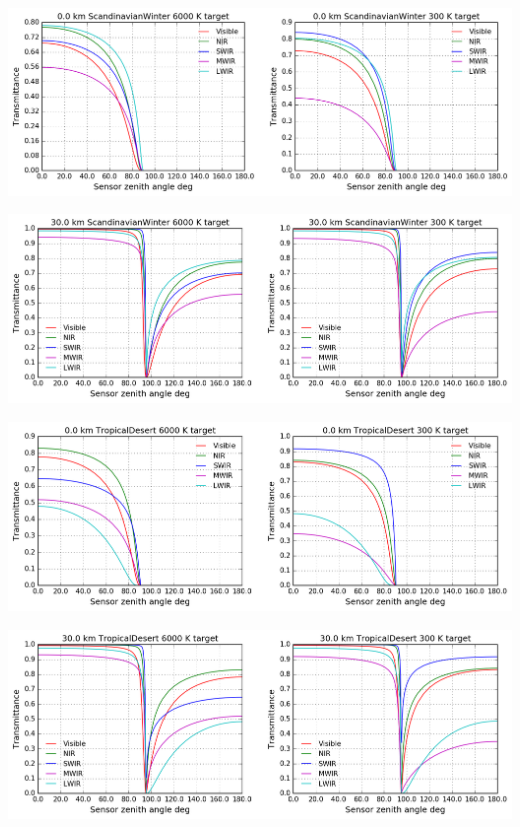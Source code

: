 \documentclass{workpackage}
\begin{document}
\begin{center}
\includegraphics{./pic/Analyse-Standard-Atmospheres_43_10.png}
\end{center}

\begin{center}
\includegraphics{./pic/Analyse-Standard-Atmospheres_43_11.png}
\end{center}

\begin{center}
\includegraphics{./pic/Analyse-Standard-Atmospheres_43_12.png}
\end{center}

\begin{center}
\includegraphics{./pic/Analyse-Standard-Atmospheres_43_13.png}
\end{center}
\end{document}

